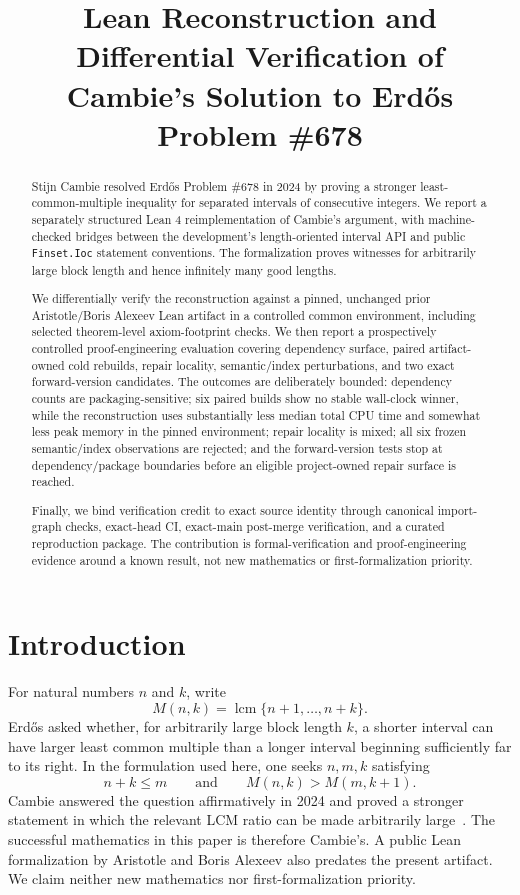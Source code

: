 \documentclass[sigplan,10pt,anonymous,review]{acmart}
\title{Lean Reconstruction and Differential Verification of Cambie's Solution to Erd\H{o}s Problem \#678}
\newcommand{\code}[1]{\texttt{#1}}
\newcommand{\M}{M}
\begin{document}
\begin{abstract}
Stijn Cambie resolved Erd\H{o}s Problem \#678 in 2024 by proving a stronger least-common-multiple inequality for separated intervals of consecutive integers. We report a separately structured Lean 4 reimplementation of Cambie's argument, with machine-checked bridges between the development's length-oriented interval API and public \code{Finset.Ioc} statement conventions. The formalization proves witnesses for arbitrarily large block length and hence infinitely many good lengths.

We differentially verify the reconstruction against a pinned, unchanged prior Aristotle/Boris Alexeev Lean artifact in a controlled common environment, including selected theorem-level axiom-footprint checks. We then report a prospectively controlled proof-engineering evaluation covering dependency surface, paired artifact-owned cold rebuilds, repair locality, semantic/index perturbations, and two exact forward-version candidates. The outcomes are deliberately bounded: dependency counts are packaging-sensitive; six paired builds show no stable wall-clock winner, while the reconstruction uses substantially less median total CPU time and somewhat less peak memory in the pinned environment; repair locality is mixed; all six frozen semantic/index observations are rejected; and the forward-version tests stop at dependency/package boundaries before an eligible project-owned repair surface is reached.

Finally, we bind verification credit to exact source identity through canonical import-graph checks, exact-head CI, exact-main post-merge verification, and a curated reproduction package. The contribution is formal-verification and proof-engineering evidence around a known result, not new mathematics or first-formalization priority.
\end{abstract}


\maketitle

\section{Introduction}
For natural numbers $n$ and $k$, write
\[
  \M(n,k)=\operatorname{lcm}\{n+1,\ldots,n+k\}.
\]
Erd\H{o}s asked whether, for arbitrarily large block length $k$, a shorter interval can have larger least common multiple than a longer interval beginning sufficiently far to its right. In the formulation used here, one seeks $n,m,k$ satisfying
\[
  n+k\le m
  \qquad\text{and}\qquad
  \M(n,k)>\M(m,k+1).
\]
Cambie answered the question affirmatively in 2024 and proved a stronger statement in which the relevant LCM ratio can be made arbitrarily large~\cite{cambie2024}. The successful mathematics in this paper is therefore Cambie's. A public Lean formalization by Aristotle and Boris Alexeev also predates the present artifact. We claim neither new mathematics nor first-formalization priority.
\end{document}
